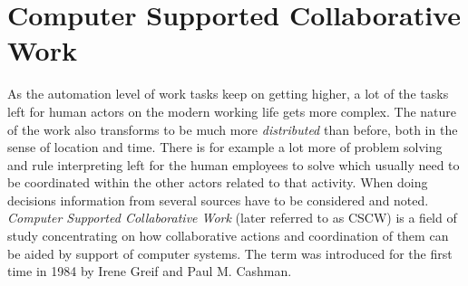 












\section{Computer Supported Collaborative Work}



As the automation level of work tasks keep on getting higher, a lot of the tasks left for human actors on the modern working life gets more complex. The nature of the work also transforms to be much more \textit{distributed} than before, both in the sense of location and time. There is for example a lot more of problem solving and rule interpreting left for the human employees to solve which usually need to be coordinated within the other actors related to that activity. When doing decisions information from several sources have to be considered and noted. \textit{Computer Supported Collaborative Work} (later referred to as CSCW) is a field of study concentrating on how collaborative actions and coordination of them can be aided by support of computer systems. The term was introduced for the first time in 1984 by Irene Greif and Paul M. Cashman. \cite{carstensen_computer_1999}

